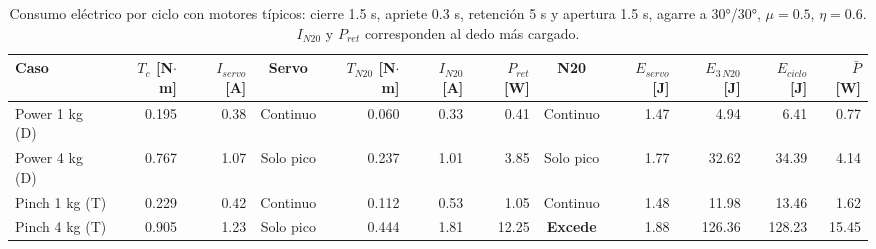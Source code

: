 \begin{table}[H]
\centering

\begin{adjustbox}{max width=\textwidth}
\begin{tabular}{|l|r|r|c|r|r|r|c|r|r|r|r|}
\hline
\textbf{Caso} & \textbf{$T_c$ [N$\cdot$m]} & \textbf{$I_{servo}$ [A]} & \textbf{Servo} & \textbf{$T_{N20}$ [N$\cdot$m]} & \textbf{$I_{N20}$ [A]} & \textbf{$P_{ret}$ [W]} & \textbf{N20} & \textbf{$E_{servo}$ [J]} & \textbf{$E_{3\,N20}$ [J]} & \textbf{$E_{ciclo}$ [J]} & \textbf{$\bar P$ [W]} \\ \hline
Power 1 kg (D) & 0.195 & 0.38 & Continuo & 0.060 & 0.33 & 0.41 & Continuo & 1.47 & 4.94 & 6.41 & 0.77 \\ \hline
Power 4 kg (D) & 0.767 & 1.07 & Solo pico & 0.237 & 1.01 & 3.85 & Solo pico & 1.77 & 32.62 & 34.39 & 4.14 \\ \hline
Pinch 1 kg (T) & 0.229 & 0.42 & Continuo & 0.112 & 0.53 & 1.05 & Continuo & 1.48 & 11.98 & 13.46 & 1.62 \\ \hline
Pinch 4 kg (T) & 0.905 & 1.23 & Solo pico & 0.444 & 1.81 & 12.25 & \textbf{Excede} & 1.88 & 126.36 & 128.23 & 15.45 \\ \hline
\end{tabular}
\end{adjustbox}
\caption{Consumo eléctrico por ciclo con motores típicos: cierre 1.5 s, apriete 0.3 s, retención 5 s y apertura 1.5 s, agarre a 30°/30°, $\mu = 0.5$, $\eta = 0.6$. $I_{N20}$ y $P_{ret}$ corresponden al dedo más cargado.}
\label{tab:consumo}
\end{table}